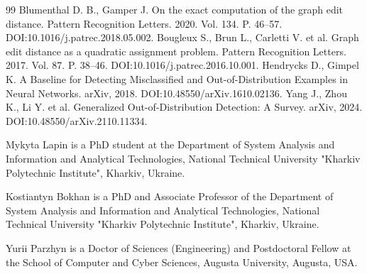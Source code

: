 \documentclass[conference]{IEEEtran}
\begin{document}
\begin{thebibliography}{99}
 Blumenthal D. B., Gamper J. On the exact computation of the graph edit distance. Pattern Recognition Letters. 2020. Vol. 134. P. 46--57. DOI:10.1016/j.patrec.2018.05.002.
 Bougleux S., Brun L., Carletti V. et al. Graph edit distance as a quadratic assignment problem. Pattern Recognition Letters. 2017. Vol. 87. P. 38--46. DOI:10.1016/j.patrec.2016.10.001.
 Hendrycks D., Gimpel K. A Baseline for Detecting Misclassified and Out-of-Distribution Examples in Neural Networks. arXiv, 2018. DOI:10.48550/arXiv.1610.02136.
 Yang J., Zhou K., Li Y. et al. Generalized Out-of-Distribution Detection: A Survey. arXiv, 2024. DOI:10.48550/arXiv.2110.11334.

\end{thebibliography}

\begin{IEEEbiographynophoto}{Mykyta Lapin}
is a PhD student at the Department of System Analysis and Information and Analytical Technologies, National Technical University "Kharkiv Polytechnic Institute", Kharkiv, Ukraine.
\end{IEEEbiographynophoto}

\begin{IEEEbiographynophoto}{Kostiantyn Bokhan}
is a PhD and Associate Professor of the Department of System Analysis and Information and Analytical Technologies, National Technical University "Kharkiv Polytechnic Institute", Kharkiv, Ukraine.
\end{IEEEbiographynophoto}

\begin{IEEEbiographynophoto}{Yurii Parzhyn}
is a Doctor of Sciences (Engineering) and Postdoctoral Fellow at the School of Computer and Cyber Sciences, Augusta University, Augusta, USA.
\end{IEEEbiographynophoto}
\end{document}
